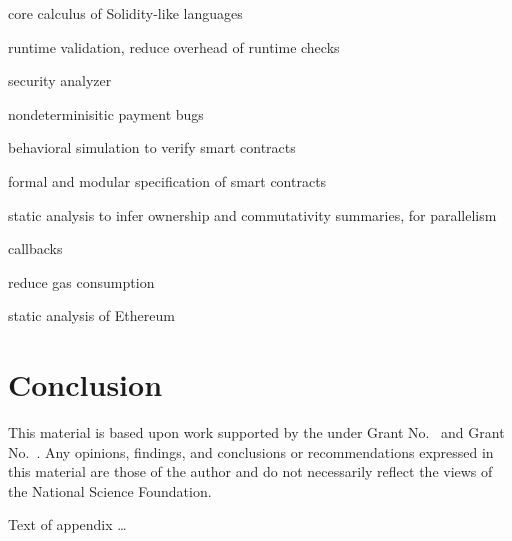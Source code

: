 \documentclass[acmsmall,review,anonymous]{acmart}\settopmatter{printfolios=true,printccs=false,printacmref=false}
\begin{document}
core calculus of Solidity-like languages \cite{Sergey2021, DBLP:conf/esorics/BartolettiGM19, DBLP:conf/fc/CrafaPZ19}

runtime validation, reduce overhead of runtime checks \cite{DBLP:conf/pldi/LiCL20}

security analyzer \cite{DBLP:conf/pldi/BrentGLSS20}

nondeterminisitic payment bugs \cite{DBLP:journals/pacmpl/WangZS19}

behavioral simulation to verify smart contracts \cite{DBLP:conf/pldi/BeillahiCEE20}

formal and modular specification of smart contracts \cite{DBLP:journals/pacmpl/BramEMSS21}

static analysis to infer ownership and commutativity summaries, for parallelism
\cite{DBLP:conf/pldi/Pirlea0S21}

callbacks \cite{DBLP:journals/pacmpl/AlbertGRRRS20, DBLP:journals/pacmpl/GrossmanAGMRSZ18}

reduce gas consumption \cite{DBLP:journals/pacmpl/GrechKJBSS18}

static analysis of Ethereum \cite{DBLP:journals/pacmpl/SmaragdakisGLTT21}

\section{Conclusion}


\begin{acks}                            %
  This material is based upon work supported by the
   under Grant
  No.~ and Grant
  No.~.  Any opinions, findings, and
  conclusions or recommendations expressed in this material are those
  of the author and do not necessarily reflect the views of the
  National Science Foundation.
\end{acks}






Text of appendix \ldots
\end{document}
